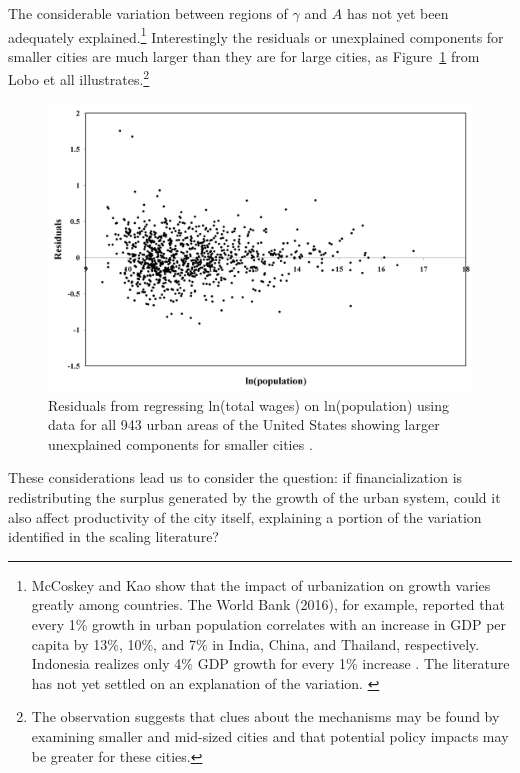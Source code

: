 The considerable variation between regions of $\gamma$ and $A$ \cite{mccoskeyPanelDataInvestigation1999, haryantotriRelationshipUrbanizationEducation2021, pugaMagnitudeCausesAgglomeration2010, loboUrbanScalingProduction2013} has not yet been adequately explained.\footnote{McCoskey and Kao \cite{mccoskeyPanelDataInvestigation1999} show that the impact of urbanization on growth varies greatly among countries. The World Bank (2016), for example, reported that every 1\% growth in urban population correlates with an increase in GDP per capita by 13\%, 10\%, and 7\% in India, China, and Thailand, respectively. Indonesia realizes only 4\% GDP growth for every 1\% increase \cite{haryantotriRelationshipUrbanizationEducation2021}.  The literature has not yet settled on an explanation of the variation.  \cite{loboUrbanScalingProduction2013, pugaMagnitudeCausesAgglomeration2010}} 
Interestingly the residuals or unexplained components for smaller cities are much larger than they are for large cities, as Figure~\ref{fig-residuals-lobo} from Lobo et all \cite{loboUrbanScalingProduction2013} illustrates.\footnote{The observation suggests that clues about the mechanisms may be found by examining smaller and mid-sized cities and that potential policy impacts may be greater for these cities.} 
\begin{figure}[h!tb]
\centering
\includegraphics[scale=0.40]{fig/residuals-lobo.png}
\caption{Residuals from regressing ln(total wages) on ln(population) using data for all 943 urban areas of the United States showing larger unexplained components for smaller cities  \cite{loboUrbanScalingProduction2013}.}\label{fig-residuals-lobo}
\end{figure} 
These considerations lead us to consider the question: if financialization is redistributing the surplus generated by the growth of the urban system, could it also affect  productivity of the city itself, explaining a portion of the variation identified in the scaling literature? 



